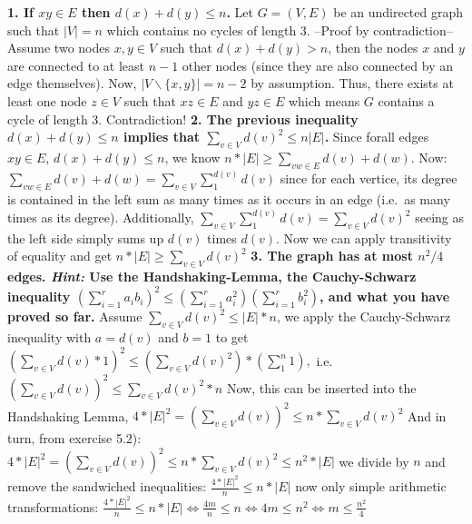 \documentclass[
]{article}
\begin{document}
\textbf{1. If \(xy \in E\) then \(d(x) + d(y) \leq n\).} Let
\(G = (V,E)\) be an undirected graph such that \(|V| = n\) which
contains no cycles of length 3. --Proof by contradiction-- Assume two
nodes \(x,y \in V\) such that \(d(x) + d(y) > n\), then the nodes \(x\)
and \(y\) are connected to at least \(n-1\) other nodes (since they are
also connected by an edge themselves). Now,
\(|V \backslash \{x,y\}| = n-2\) by assumption. Thus, there exists at
least one node \(z \in V\) such that \(xz \in E\) and \(yz \in E\) which
means \(G\) contains a cycle of length 3. Contradiction! \textbf{2. The
previous inequality \(d(x) + d(y) \leq n\) implies that
\(\sum_{v \in V} d(v)^2 \leq n|E|\).} Since forall edges \(xy \in E\),
\(d(x) + d(y) \leq n\), we know
\(n*|E| \geq \sum_{vw \in E} d(v) + d(w)\). Now:
\(\sum_{vw \in E} d(v) + d(w) = \sum_{v \in V} \sum_{1}^{d(v)} d(v)\)
since for each vertice, its degree is contained in the left sum as many
times as it occurs in an edge (i.e.~as many times as its degree).
Additionally,
\(\sum_{v \in V} \sum_{1}^{d(v)} d(v) = \sum_{v \in V} d(v)^2\) seeing
as the left side simply sums up \(d(v)\) times \(d(v)\). Now we can
apply transitivity of equality and get
\(n* |E| \geq \sum_{v \in V} d(v)^2\) \textbf{3. The graph has at most
\(n^2/4\) edges. \emph{Hint:} Use the Handshaking-Lemma, the
Cauchy-Schwarz inequality
\((\sum_{i=1}^r a_i b_i)^2 \leq (\sum_{i=1}^r a_i^2) (\sum_{i=1}^r b_i^2)\),
and what you have proved so far.} Assume
\(\sum_{v \in V} d(v)^2 \leq |E| * n\), we apply the Cauchy-Schwarz
inequality with \(a = d(v)\) and \(b=1\) to get
\((\sum_{v \in V} d(v) * 1)^2 \leq (\sum_{v \in V} d(v)^2) * (\sum_1^n 1),\)
i.e.~ \((\sum_{v \in V} d(v))^2 \leq \sum_{v \in V} d(v)^2 * n\) Now,
this can be inserted into the Handshaking Lemma,
\(4*|E|^2 = (\sum_{v \in V} d(v))^2 \leq n * \sum_{v \in V} d(v)^2\) And
in turn, from exercise 5.2):
\(4*|E|^2 = (\sum_{v \in V} d(v))^2 \leq n * \sum_{v \in V} d(v)^2 \leq n^2 * |E|\)
we divide by \(n\) and remove the sandwiched inequalities:
\(\frac{4*|E|^2}{n} \leq n * |E|\) now only simple arithmetic
transformations:
\(\frac{4*|E|^2}{n} \leq n * |E| \Leftrightarrow \frac{4m}{n} \leq n \Leftrightarrow 4m \leq n^2 \Leftrightarrow m \leq \frac{n^2}{4}\)
\end{document}
